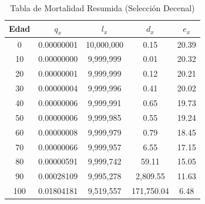 \begin{table}[H]
\centering
\caption{Tabla de Mortalidad Resumida (Selección Decenal)}
\label{tab:mortalidad_resumen}
\small
\begin{tabular}{ccccc}
\toprule
\textbf{Edad} & \textbf{$q_x$} & \textbf{$l_x$} & \textbf{$d_x$} & \textbf{$e_x$} \\
\midrule
0 & 0.00000001 & 10,000,000 & 0.15 & 20.39 \\
10 & 0.00000000 & 9,999,999 & 0.01 & 20.32 \\
20 & 0.00000001 & 9,999,999 & 0.12 & 20.21 \\
30 & 0.00000004 & 9,999,996 & 0.41 & 20.02 \\
40 & 0.00000006 & 9,999,991 & 0.65 & 19.73 \\
50 & 0.00000006 & 9,999,985 & 0.55 & 19.24 \\
60 & 0.00000008 & 9,999,979 & 0.79 & 18.45 \\
70 & 0.00000066 & 9,999,957 & 6.55 & 17.15 \\
80 & 0.00000591 & 9,999,742 & 59.11 & 15.05 \\
90 & 0.00028109 & 9,995,278 & 2,809.55 & 11.63 \\
100 & 0.01804181 & 9,519,557 & 171,750.04 & 6.48 \\
\bottomrule
\end{tabular}
\end{table}
